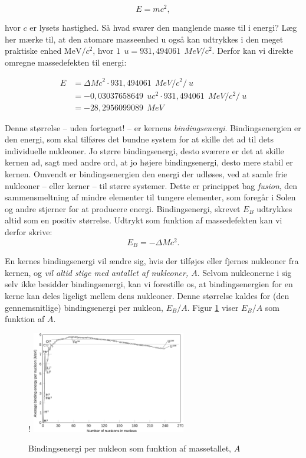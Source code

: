 \begin{equation}
E = m c^2, 
\label{eq:einstein}
\end{equation}

hvor $c$ er lysets hastighed.
Så hvad svarer den manglende masse til i energi? Læg her mærke til, at den atomare masseenhed u også kan udtrykkes i den meget praktiske enhed $\text{MeV}/c^2$, hvor $1~\SI{}{u}=931,494061~\SI{}{MeV}/c^2$. Derfor kan vi direkte omregne massedefekten til energi:

\begin{align*}
E &= \Delta M c^2 \cdot 931,494061~\SI{}{MeV}/c^2/\SI{}{u} \\
&= -0,03037658649 ~\SI{}{u} c^2 \cdot 931,494061~\SI{}{MeV}/c^2/\SI{}{u} \\
&= -28,2956099089 ~\SI{}{MeV}
\end{align*}

Denne størrelse -- uden fortegnet! -- er kernens \emph{bindingsenergi}. Bindingsenergien er den energi, som skal tilføres det bundne system for at skille det ad til dets individuelle nukleoner. Jo større bindingsenergi, desto sværere er det at skille kernen ad, sagt med andre ord, at jo højere bindingsenergi, desto mere stabil er kernen. Omvendt er bindingsenergien den energi der udløses, ved at samle frie nukleoner --  eller kerner -- til større systemer. Dette er princippet bag \emph{fusion}, den sammensmeltning af mindre elementer til tungere elementer, som foregår i Solen og andre stjerner for at producere energi.
Bindingsenergi, skrevet $E_B$ udtrykkes altid som en positiv størrelse. Udtrykt som funktion af massedefekten kan vi derfor skrive:
\begin{equation}
E_B = - \Delta M c^2.
\label{eq:binding}
\end{equation} 

En kernes bindingsenergi vil ændre sig, hvis der tilføjes eller fjernes nukleoner fra kernen, og \emph{vil altid stige med antallet af nukleoner, $A$}. Selvom nukleonerne i sig selv ikke besidder bindingsenergi, kan vi forestille os, at bindingsenergien for en kerne kan deles ligeligt mellem dens nukleoner. Denne størrelse kaldes for (den gennemsnitlige) bindingsenergi per nukleon, $E_B/A$. Figur \ref{fig:binding} viser $E_B/A$ som funktion af $A$. 

\begin{figure}[h]!
  \centering
  \includegraphics[width=0.6\textwidth]{KernePartikel/binding_energy.png}
  \caption{Bindingsenergi per nukleon som funktion af massetallet, $A$}
  \label{fig:binding}
\end{figure}

